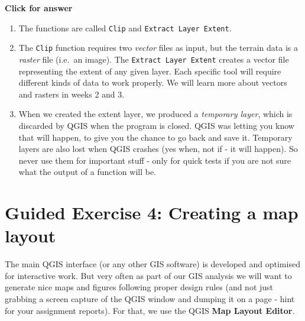 \documentclass[
  letterpaper,
  DIV=11,
  numbers=noendperiod]{scrreprt}
\begin{document}
\begin{tcolorbox}[enhanced jigsaw, toprule=.15mm, breakable, left=2mm, colframe=quarto-callout-important-color-frame, colback=white, arc=.35mm, leftrule=.75mm, opacityback=0, rightrule=.15mm, bottomrule=.15mm]

\vspace{-3mm}\textbf{Click for answer}\vspace{3mm}

\begin{enumerate}
\def\labelenumi{\alph{enumi})}
\item
  The functions are called \texttt{Clip} and
  \texttt{Extract\ Layer\ Extent}.
\item
  The \texttt{Clip} function requires two \emph{vector} files as input,
  but the terrain data is a \emph{raster} file (i.e.~an image). The
  \texttt{Extract\ Layer\ Extent} creates a vector file representing the
  extent of any given layer. Each specific tool will require different
  kinds of data to work properly. We will learn more about vectors and
  rasters in weeks 2 and 3.
\item
  When we created the extent layer, we produced a \emph{temporary
  layer}, which is discarded by QGIS when the program is closed. QGIS
  was letting you know that will happen, to give you the chance to go
  back and save it. Temporary layers are also lost when QGIS crashes
  (yes when, not if - it will happen). So never use them for important
  stuff - only for quick tests if you are not sure what the output of a
  function will be.\\
\end{enumerate}

\end{tcolorbox}

\section{Guided Exercise 4: Creating a map
layout}\label{guided-exercise-4-creating-a-map-layout}

The main QGIS interface (or any other GIS software) is developed and
optimised for interactive work. But very often as part of our GIS
analysis we will want to generate nice maps and figures following proper
design rules (and not just grabbing a screen capture of the QGIS window
and dumping it on a page - hint for your assignment reports). For that,
we use the QGIS \textbf{Map Layout Editor}.
\end{document}
